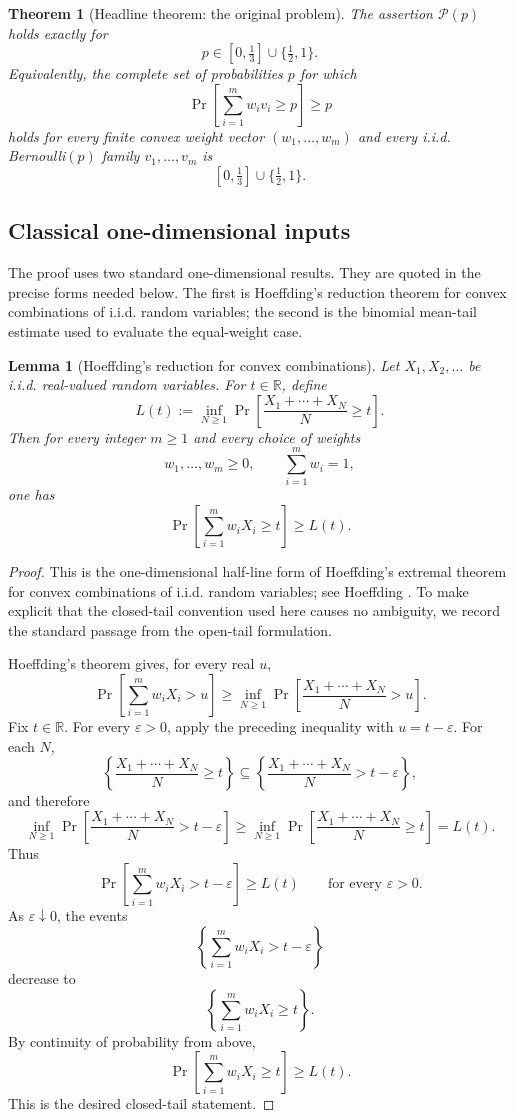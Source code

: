 \documentclass[12pt]{article}
\theoremstyle{definition}
\theoremstyle{plain}
\newtheorem{theorem}[definition]{Theorem}
\newtheorem{lemma}[definition]{Lemma}
\theoremstyle{remark}
\begin{document}
\begin{theorem}[Headline theorem: the original problem]\label{thm:main}
The assertion \(\mathcal P(p)\) holds exactly for
\[
p\in[0,\tfrac13]\cup\{\tfrac12,1\}.
\]
Equivalently, the complete set of probabilities \(p\) for which
\[
\Pr\!\left[\sum_{i=1}^{m} w_i v_i\ge p\right]\ge p
\]
holds for every finite convex weight vector \((w_1,\ldots,w_m)\) and every i.i.d. Bernoulli\((p)\) family \(v_1,\ldots,v_m\) is
\[
\boxed{[0,\tfrac13]\cup\{\tfrac12,1\}}.
\]
\end{theorem}

\subsection{Classical one-dimensional inputs}

The proof uses two standard one-dimensional results. They are quoted in the precise forms needed below. The first is Hoeffding's reduction theorem for convex combinations of i.i.d. random variables; the second is the binomial mean-tail estimate used to evaluate the equal-weight case.

\begin{lemma}[Hoeffding's reduction for convex combinations]\label{lem:hoeffding}
Let \(X_1,X_2,\ldots\) be i.i.d. real-valued random variables. For \(t\in\mathbb R\), define
\[
L(t):=\inf_{N\ge1}
\Pr\!\left[\frac{X_1+\cdots+X_N}{N}\ge t\right].
\]
Then for every integer \(m\ge1\) and every choice of weights
\[
w_1,\ldots,w_m\ge0,\qquad \sum_{i=1}^{m}w_i=1,
\]
one has
\[
\Pr\!\left[\sum_{i=1}^{m} w_iX_i\ge t\right]\ge L(t).
\]
\end{lemma}

\begin{proof}
This is the one-dimensional half-line form of Hoeffding's extremal theorem for convex combinations of i.i.d. random variables; see Hoeffding \cite{Hoeffding1955}. To make explicit that the closed-tail convention used here causes no ambiguity, we record the standard passage from the open-tail formulation.

Hoeffding's theorem gives, for every real \(u\),
\[
\Pr\!\left[\sum_{i=1}^{m}w_iX_i>u\right]
\ge
\inf_{N\ge1}
\Pr\!\left[\frac{X_1+\cdots+X_N}{N}>u\right].
\]
Fix \(t\in\mathbb R\). For every \(\varepsilon>0\), apply the preceding inequality with \(u=t-\varepsilon\). For each \(N\),
\[
\left\{\frac{X_1+\cdots+X_N}{N}\ge t\right\}
\subseteq
\left\{\frac{X_1+\cdots+X_N}{N}>t-\varepsilon\right\},
\]
and therefore
\[
\inf_{N\ge1}
\Pr\!\left[\frac{X_1+\cdots+X_N}{N}>t-\varepsilon\right]
\ge
\inf_{N\ge1}
\Pr\!\left[\frac{X_1+\cdots+X_N}{N}\ge t\right]
=L(t).
\]
Thus
\[
\Pr\!\left[\sum_{i=1}^{m}w_iX_i>t-\varepsilon\right]\ge L(t)
\qquad\text{for every }\varepsilon>0.
\]
As \(\varepsilon\downarrow0\), the events
\[
\left\{\sum_{i=1}^{m}w_iX_i>t-\varepsilon\right\}
\]
decrease to
\[
\left\{\sum_{i=1}^{m}w_iX_i\ge t\right\}.
\]
By continuity of probability from above,
\[
\Pr\!\left[\sum_{i=1}^{m}w_iX_i\ge t\right]\ge L(t).
\]
This is the desired closed-tail statement.
\end{proof}
\end{document}
